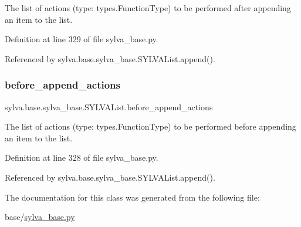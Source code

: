 The list of actions (type\+: types.\+Function\+Type) to be performed after appending an item to the list. 



Definition at line 329 of file sylva\+\_\+base.\+py.



Referenced by sylva.\+base.\+sylva\+\_\+base.\+S\+Y\+L\+V\+A\+List.\+append().

\mbox{\label{classsylva_1_1base_1_1sylva__base_1_1_s_y_l_v_a_list_a5ecf6ed5a0fbfa81d3c657a18a71a934}} 
\subsubsection{\texorpdfstring{before\+\_\+append\+\_\+actions}{before\_append\_actions}}
{\footnotesize\ttfamily sylva.\+base.\+sylva\+\_\+base.\+S\+Y\+L\+V\+A\+List.\+before\+\_\+append\+\_\+actions}



The list of actions (type\+: types.\+Function\+Type) to be performed before appending an item to the list. 



Definition at line 328 of file sylva\+\_\+base.\+py.



Referenced by sylva.\+base.\+sylva\+\_\+base.\+S\+Y\+L\+V\+A\+List.\+append().



The documentation for this class was generated from the following file\+:\begin{DoxyCompactItemize}
\item 
base/\hyperlink{sylva__base_8py}{sylva\+\_\+base.\+py}\end{DoxyCompactItemize}
